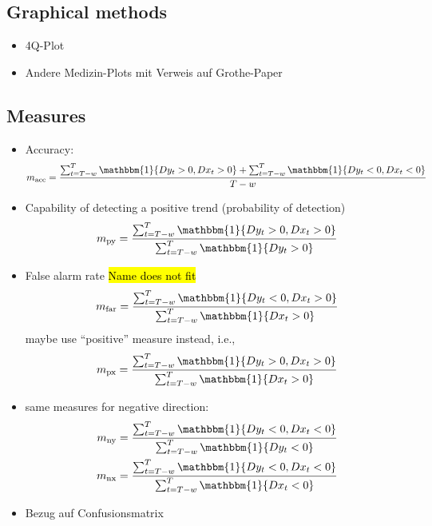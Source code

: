 \documentclass[oneside]{article}
\theoremstyle{plain}%
\theoremstyle{definition}
\newcommand{\ind}[1]{\mathbbm{1}\{#1\}}
\newcommand{\ydiff}{D y}
\newcommand{\xdiff}{Dx}
\begin{document}
\subsection{Graphical methods}


\begin{itemize}
  \item 4Q-Plot
  \item Andere Medizin-Plots mit Verweis auf Grothe-Paper
\end{itemize}


\subsection{Measures}


\begin{itemize}
  \item Accuracy: \begin{equation}
  	m_{\text{acc}} = \frac{\sum_{t=T-w}^T \ind{\ydiff_t > 0, \xdiff_t > 0} + \sum_{t=T-w}^T \ind{\ydiff_t < 0, \xdiff_t < 0}}{T-w}
\end{equation}
	\item Capability of detecting a positive trend (probability of detection)
	\begin{equation}
  		m_{\text{py}} = \frac{\sum_{t=T-w}^T \ind{\ydiff_t > 0, \xdiff_t > 0}}{\sum_{t=T-w}^T \ind{\ydiff_t > 0}}
	\end{equation}
	\item False alarm rate \hl{Name does not fit} \begin{equation}
  m_{\text{far}} = \frac{\sum_{t=T-w}^T \ind{\ydiff_t < 0, \xdiff_t > 0}}{\sum_{t=T-w}^T \ind{\xdiff_t > 0}}
\end{equation}
maybe use \enquote{positive} measure instead, i.e.,
\begin{equation}
  m_{\text{px}} = \frac{\sum_{t=T-w}^T \ind{\ydiff_t > 0, \xdiff_t > 0}}{\sum_{t=T-w}^T \ind{\xdiff_t > 0}}  
\end{equation}
	\item same measures for negative direction:
	\begin{align}
		m_{\text{ny}} &=  \frac{\sum_{t=T-w}^T \ind{\ydiff_t < 0, \xdiff_t < 0}}{\sum_{t=T-w}^T \ind{\ydiff_t < 0}} \\
		m_{\text{nx}} &=  \frac{\sum_{t=T-w}^T \ind{\ydiff_t < 0, \xdiff_t < 0}}{\sum_{t=T-w}^T \ind{\xdiff_t < 0}}
	\end{align}
 \item Bezug auf Confusionsmatrix 
\end{itemize}
\end{document}
